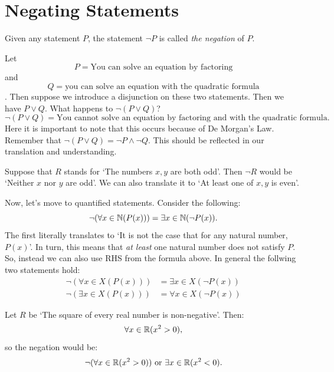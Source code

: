 \section{Negating Statements}

Given any statement $P$, the statement $\neg P$ is called \emph{the negation} of $P$. 
\begin{example}
    Let
    $$P=\text{You can solve an equation by factoring}$$ and $$Q= \text{you can solve an equation with the quadratic formula}$$. Then suppose we introduce a disjunction on these two statements. Then we have $P\lor Q$. What happens to $\neg (P\lor Q)$? 
    $$
    \neg (P\lor Q) = \text{You cannot solve an equation by factoring and with the quadratic formula.}
    $$
    Here it is important to note that this occurs because of De Morgan's Law. Remember that $\neg (P\lor Q)=\neg P \land \neg Q$. This should be reflected in our translation and understanding.  
\end{example}

\begin{example}
    Suppose that $R$ stands for `The numbers $x,y$ are both odd'. Then $\neg R$ would be `Neither $x$ nor $y$ are odd'. We can also translate it to `At least one of $x,y$ is even'.
\end{example}

Now, let's move to quantified statements. Consider the following: 
$$
\neg(\forall x\in\mathbb{N}(P(x)))=\exists x\in\mathbb{N}(\neg P(x)).
$$
The first literally translates to `It is not the case that for any natural number, $P(x)$'. In turn, this means that \emph{at least} one natural number does not satisfy $P$. So, instead we can also use RHS from the formula above. In general the follwing two statements hold: 
$$
    \begin{aligned}
        \neg(\forall x\in X(P(x)))&=\exists x\in X(\neg P(x))\\
        \neg(\exists x\in X(P(x)))&=\forall x\in X(\neg P(x))
    \end{aligned}
$$
\begin{example}
    Let $R$ be `The square of every real number is non-negative'. Then: 
    $$
    \forall x\in\mathbb{R}(x^{2}>0), 
    $$
    so the negation would be:
    $$
    \neg(\forall x\in\mathbb{R}(x^{2}>0)) \text{ or } \exists x\in\mathbb{R}(x^{2}<0).
    $$
\end{example}
 
